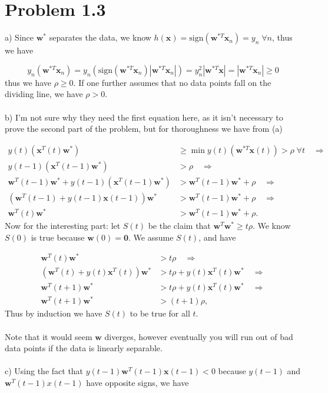 \documentclass[11pt,letterpaper]{article}
\newcommand{\sign}[0]{\textrm{sign}}
\newcommand{\vv}[1]{\mathbf{#1}} %
\begin{document}
\section*{Problem 1.3}

a) Since $\vv{w}^*$ separates the data, we know $h(\vv{x}) = \sign(\vv{w}^{*T}\vv{x}_n) = y_n \; \forall n$, thus we have

\begin{equation*}
    y_n(\vv{w}^{*T}\vv{x}_n) = y_n(\sign(\vv{w}^{*T}\vv{x}_n)|\vv{w}^{*T}\vv{x}_n|) = y_n^2 |\vv{w}^{*T}\vv{x}| = |\vv{w}^{*T}\vv{x}_n| \ge 0
\end{equation*}
thus we have $\rho \ge 0$.  If one further assumes that no data points fall on the dividing line, we have $\rho > 0$.
\\\\
b) I'm not sure why they need the first equation here, as it isn't necessary to prove the second part of the problem, but for thoroughness we have from (a)

\begin{align*}
     y(t)(\vv{x}^T(t)\vv{w}^*) &\ge \min y(t)(\vv{w}^{*T}\vv{x}(t)) > \rho \; \forall t \quad \Longrightarrow \\
     y(t - 1)(\vv{x}^T(t - 1)\vv{w}^*) &> \rho \quad \Longrightarrow \\
     \vv{w}^T(t - 1)\vv{w}^*  + y(t - 1)(\vv{x}^T(t - 1)\vv{w}^*) &> \vv{w}^T(t - 1)\vv{w}^* + \rho \quad \Longrightarrow \\
     (\vv{w}^T(t - 1) + y(t - 1)\vv{x}(t - 1))\vv{w}^* &> \vv{w}^T(t - 1)\vv{w}^* + \rho \quad \Longrightarrow \\
     \vv{w}^T(t)\vv{w}^* &> \vv{w}^T(t - 1)\vv{w}^* + \rho.
\end{align*}
Now for the interesting part: let $S(t)$ be the claim that $\vv{w}^T\vv{w}^* \ge t\rho$.  We know $S(0)$ is true because $\vv{w}(0) = \vv{0}$.  We assume $S(t)$, and have

\begin{align*}
 \vv{w}^T(t)\vv{w}^* &> t\rho \quad \Longrightarrow \\
 (\vv{w}^T(t) + y(t)\vv{x}^T(t))\vv{w}^* &> t\rho +  y(t)\vv{x}^T(t)\vv{w}^* \quad \Longrightarrow \\
 \vv{w}^T(t + 1)\vv{w}^* &> t\rho +  y(t)\vv{x}^T(t)\vv{w}^* \quad \Longrightarrow \\
 \vv{w}^T(t + 1)\vv{w}^* &> (t + 1)\rho,
\end{align*}
Thus by induction we have $S(t)$ to be true for all $t$.
\\\\
Note that it would seem $\vv{w}$ diverges, however eventually you will run out of bad data points if the data is linearly separable.
\\\\
c) Using the fact that $y(t-1)\vv{w}^T(t - 1)\vv{x}(t-1) < 0$ because $y(t-1)$ and $\vv{w}^T(t-1){x}(t-1)$ have opposite signs, we have
\end{document}
